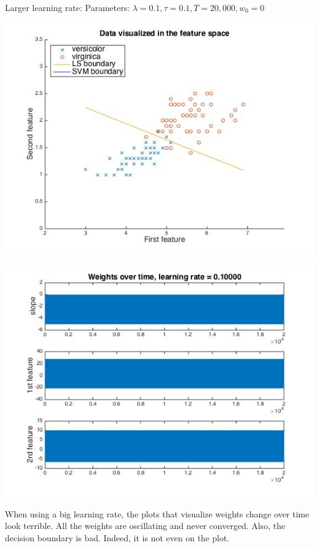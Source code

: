 \documentclass[paper=a4, fontsize=11pt]{scrartcl} %
\numberwithin{equation}{section} %
\numberwithin{figure}{section} %
\numberwithin{table}{section} %
\begin{document}
\newpage
Larger learning rate: Parameters:
$\lambda = 0.1, \tau = 0.1, T = 20,000, w_0 = 0$
\begin{center}
\includegraphics[scale=.6]{hw7_4c_biglr_532.jpg}
\end{center}
\begin{center}
\includegraphics[scale=.5]{hw7_4c_biglr_weights_532.jpg}
\end{center}

When using a big learning rate, the plots that visualize weights change over time look terrible. All the weights are oscillating and never converged. Also, the decision boundary is bad. Indeed, it is not even on the plot. 
\end{document}
